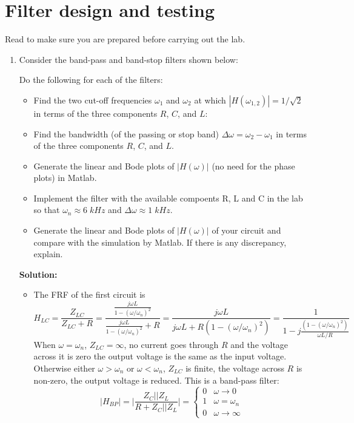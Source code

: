
\usepackage{html}



\section*{Filter design and testing}

Read 
to make sure you are prepared before carrying out the lab.

\begin{enumerate}

\item Consider the band-pass and band-stop filters shown below:

  
  Do the following for each of the filters:
  \begin{itemize}
  \item Find the two cut-off frequencies $\omega_1$ and $\omega_2$ at which
    $|H(\omega_{1,2})|=1/\sqrt{2}$ in terms of the three components $R$, $C$, 
    and $L$:
  \item Find the bandwidth (of the passing or stop band)
    $\Delta\omega=\omega_2-\omega_1$ in terms of the three components $R$, 
    $C$, and $L$.
  \item Generate the linear and Bode plots of $|H(\omega)|$ (no need for the 
    phase plots) in Matlab.
  \item Implement the filter with the available compoents R, L and C in the 
    lab so that $\omega_n\approx 6\;kHz$ and $\Delta\omega\approx 1\;kHz$. 
  \item Generate the linear and Bode plots of $|H(\omega)|$ of your circuit
    and compare with the simulation by Matlab. If there is any discrepancy,
    explain.
  \end{itemize}

  {\bf Solution:} 

  \begin{itemize}
\item The FRF of the first circuit is
  \[
  H_{LC}=\frac{Z_{LC}}{Z_{LC}+R}=\frac{\frac{j\omega L}{1-(\omega/\omega_n)^2}}{
    \frac{j\omega L}{1-(\omega/\omega_n)^2 } +R}
  =\frac{j\omega L}{j\omega L+R(1-(\omega/\omega_n)^2)}
  =\frac{1}{1-j\frac{(1-(\omega/\omega_n)^2)}{\omega L/R}}
  \]
  When $\omega=\omega_n$, $Z_{LC}=\infty$, no current goes through 
  $R$ and the voltage across it is zero the output voltage is the 
  same as the input voltage. Otherwise either $\omega>\omega_n$ or 
  $\omega<\omega_n$, $Z_{LC}$ is finite, the voltage across $R$ is 
  non-zero, the output voltage is reduced. This is a band-pass 
  filter:
  \[ 
  |H_{BP}|=\bigg|\frac{Z_C||Z_L}{R+Z_C||Z_L}\bigg|
  =\left\{\begin{array}{cc}0&\omega\rightarrow 0\\
  1&\omega=\omega_n\\ 0&\omega\rightarrow\infty\end{array}\right.
  \]


\end{itemize}
\end{enumerate}
